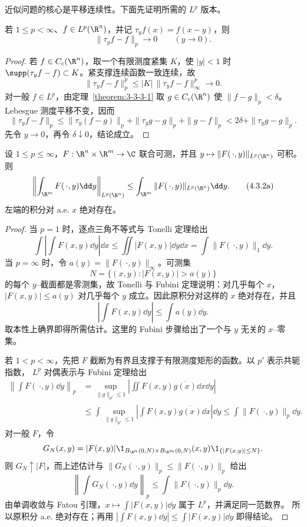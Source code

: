 近似问题的核心是平移连续性。下面先证明所需的 $L^p$ 版本。

\begin{lemma}[$L^p$ 中的平移连续性]\label{lemma:4-3-1-translation}
若 $1\leq p<\infty$、$f\in L^p(\R^n)$，并记 $\tau_yf(x)=f(x-y)$，则
\[
 \|\tau_yf-f\|_p\longrightarrow0\qquad(y\to0).
\]
\end{lemma}

\begin{proof}
若 $f\in C_c(\R^n)$，取一个有限测度紧集 $K$，使 $|y|<1$ 时
$\supp(\tau_yf-f)\subset K$。紧支撑连续函数一致连续，故
\[
 \|\tau_yf-f\|_p^p
 \leq |K|\,\|\tau_yf-f\|_\infty^p\longrightarrow0.
\]
对一般 $f\in L^p$，由定理~\ref{theorem:3-3-3-1} 取 $g\in C_c(\R^n)$ 使
$\|f-g\|_p<\delta$。Lebesgue 测度平移不变，因而
\[
 \|\tau_yf-f\|_p
 \leq\|\tau_y(f-g)\|_p+\|\tau_yg-g\|_p+\|g-f\|_p
 <2\delta+\|\tau_yg-g\|_p.
\]
先令 $y\to0$，再令 $\delta\downarrow0$，结论成立。
\end{proof}

\begin{lemma}\label{lemma:4-3-1-integral-minkowski}
设 $1\leq p\leq\infty$，$F:\R^n\times\R^m\to\C$ 联合可测，并且
$y\mapsto\|F(\,\cdot,y)\|_{L^p(\R^n)}$ 可积。则
\[
 \left\|\int_{\R^m}F(\,\cdot,y)\dd y\right\|_{L^p(\R^n)}
 \leq\int_{\R^m}\|F(\,\cdot,y)\|_{L^p(\R^n)}\dd y.
 \tag{4.3.2a}\label{eq:4-3-integral-minkowski}
\]
左端的积分对 a.e. $x$ 绝对存在。
\end{lemma}

\begin{proof}
当 $p=1$ 时，逐点三角不等式与 Tonelli 定理给出
\[
 \int\left|\int F(x,y)\dd y\right|\dd x
 \leq\iint|F(x,y)|\dd y\dd x
 =\int\|F(\,\cdot,y)\|_1\dd y.
\]
当 $p=\infty$ 时，令
$a(y)=\|F(\,\cdot,y)\|_\infty$。可测集
\[
 N=\{(x,y):|F(x,y)|>a(y)\}
\]
的每个 $y$--截面都是零测集，故 Tonelli 与 Fubini 定理说明：对几乎每个 $x$，
$|F(x,y)|\leq a(y)$ 对几乎每个 $y$ 成立。因此原积分对这样的 $x$ 绝对存在，并且
\[
 \left|\int F(x,y)\dd y\right|
 \leq\int a(y)\dd y.
\]
取本性上确界即得所需估计。这里的 Fubini 步骤给出了一个与 $y$ 无关的 $x$--零集。

若 $1<p<\infty$，先把 $F$ 截断为有界且支撑于有限测度矩形的函数。以 $p'$ 表示共轭指数，
$L^p$ 对偶表示与 Fubini 定理给出
\begin{align*}
 \left\|\int F(\,\cdot,y)\dd y\right\|_p
 &=\sup_{\|g\|_{p'}\leq1}
   \left|\iint F(x,y)\overline{g(x)}\dd x\dd y\right|\\
 &\leq\int\sup_{\|g\|_{p'}\leq1}
       \left|\int F(x,y)\overline{g(x)}\dd x\right|\dd y
 \leq\int\|F(\,\cdot,y)\|_p\dd y.
\end{align*}
对一般 $F$，令
\[
 G_N(x,y)=|F(x,y)|\1_{B_{\R^n}(0,N)\times B_{\R^m}(0,N)}(x,y)
             \1_{\{|F(x,y)|\leq N\}}.
\]
则 $G_N\uparrow |F|$，而上述估计与
$\|G_N(\,\cdot,y)\|_p\leq\|F(\,\cdot,y)\|_p$ 给出
\[
 \left\|\int G_N(\,\cdot,y)\dd y\right\|_p
 \leq\int\|F(\,\cdot,y)\|_p\dd y.
\]
由单调收敛与 Fatou 引理，$x\mapsto\int|F(x,y)|\dd y$ 属于 $L^p$，并满足同一范数界。
所以原积分 a.e. 绝对存在；再用
$|\int F(x,y)\dd y|\leq\int|F(x,y)|\dd y$ 即得结论。
\end{proof}

